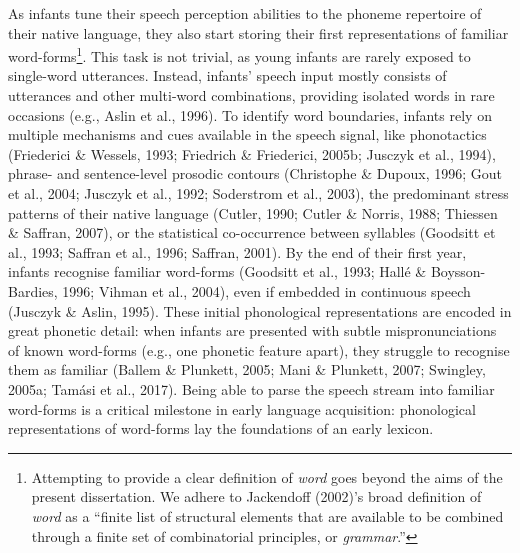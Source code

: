 \documentclass[
  12pt,
  b5paperpaper,
  twoside]{scrreprt}
\begin{document}
As infants tune their speech perception abilities to the phoneme
repertoire of their native language, they also start storing their first
representations of familiar word-forms\footnote{Attempting to provide a
  clear definition of \emph{word} goes beyond the aims of the present
  dissertation. We adhere to Jackendoff (2002)'s broad definition of
  \emph{word} as a ``finite list of structural elements that are
  available to be combined through a finite set of combinatorial
  principles, or \emph{grammar}.''}. This task is not trivial, as young
infants are rarely exposed to single-word utterances. Instead, infants'
speech input mostly consists of utterances and other multi-word
combinations, providing isolated words in rare occasions (e.g., Aslin et
al., 1996). To identify word boundaries, infants rely on multiple
mechanisms and cues available in the speech signal, like phonotactics
(Friederici \& Wessels, 1993; Friedrich \& Friederici, 2005b; Jusczyk et
al., 1994), phrase- and sentence-level prosodic contours (Christophe \&
Dupoux, 1996; Gout et al., 2004; Jusczyk et al., 1992; Soderstrom et
al., 2003), the predominant stress patterns of their native language
(Cutler, 1990; Cutler \& Norris, 1988; Thiessen \& Saffran, 2007), or
the statistical co-occurrence between syllables (Goodsitt et al., 1993;
Saffran et al., 1996; Saffran, 2001). By the end of their first year,
infants recognise familiar word-forms (Goodsitt et al., 1993; Hallé \&
Boysson-Bardies, 1996; Vihman et al., 2004), even if embedded in
continuous speech (Jusczyk \& Aslin, 1995). These initial phonological
representations are encoded in great phonetic detail: when infants are
presented with subtle mispronunciations of known word-forms (e.g., one
phonetic feature apart), they struggle to recognise them as familiar
(Ballem \& Plunkett, 2005; Mani \& Plunkett, 2007; Swingley, 2005a;
Tamási et al., 2017). Being able to parse the speech stream into
familiar word-forms is a critical milestone in early language
acquisition: phonological representations of word-forms lay the
foundations of an early lexicon.
\end{document}
